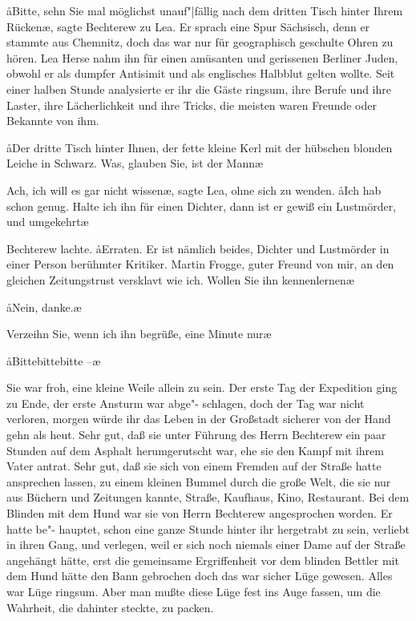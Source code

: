 \aa{}Bitte, sehn Sie mal möglichst unauf"|fällig nach dem dritten
Tisch hinter Ihrem Rücken\ae{}, sagte Bechterew zu Lea. Er
sprach eine Spur Sächsisch, denn er stammte aus Chemnitz,
doch das war nur für geographisch geschulte Ohren zu hören.
Lea Herse nahm ihn für einen amüsanten und gerissenen
Berliner Juden, obwohl er als dumpfer Antisimit und als
englisches Halbblut gelten wollte. Seit einer halben Stunde
analysierte er ihr die Gäste ringsum, ihre Berufe und ihre
Laster, ihre Lächerlichkeit und ihre Tricks, die meisten waren
Freunde oder Bekannte von ihm.

\aa{}Der dritte Tisch hinter Ihnen, der fette kleine Kerl mit der
hübschen blonden Leiche in Schwarz. Was, glauben Sie, ist
der Mann\frag{}\ae{}

\aanah{}Ach, ich will es gar nicht wissen\ae{}, sagte Lea, ohne sich zu
wenden. \aa{}Ich hab schon genug. Halte ich ihn für einen Dichter,
dann ist er gewiß ein Lustmörder, und umgekehrt\ausr{}\ae{}

Bechterew lachte. \aa{}Erraten. Er ist nämlich beides, Dichter
und Lustmörder in einer Person\dopp{} berühmter Kritiker. Martin
Frogge, guter Freund von mir, an den gleichen Zeitungstrust
versklavt wie ich. Wollen Sie ihn kennenlernen\frag{}\ae{}

\aa{}Nein, danke.\ae{}

\aanah{}Verzeihn Sie, wenn ich ihn begrüße, eine Minute nur\frag{}\ae{}

\aa{}Bittebittebitte --\ae{}

Sie war froh, eine kleine Weile allein zu sein. Der erste Tag
der Expedition ging zu Ende, der erste Ansturm war abge"-%
schlagen, doch der Tag war nicht verloren, morgen würde ihr
das Leben in der Großstadt sicherer von der Hand gehn als
heut. Sehr gut, daß sie unter Führung des Herrn Bechterew
ein paar Stunden auf dem Asphalt herumgerutscht war, ehe
sie den Kampf mit ihrem Vater antrat. Sehr gut, daß sie sich
von einem Fremden auf der Straße hatte ansprechen lassen,
zu einem kleinen Bummel durch die große Welt, die sie nur
aus Büchern und Zeitungen kannte, Straße, Kaufhaus,
Kino, Restaurant. Bei dem Blinden mit dem Hund war sie
von Herrn Bechterew angesprochen worden. Er hatte be"-%
hauptet, schon eine ganze Stunde hinter ihr hergetrabt zu
sein, verliebt in ihren Gang, und verlegen, weil er sich noch
niemals einer Dame auf der Straße angehängt hätte, erst die
gemeinsame Ergriffenheit vor dem blinden\eingriff{eS49-1}{blinden ] blindem} Bettler mit dem
Hund hätte den Bann gebrochen\dopp{} doch das war sicher Lüge
gewesen. Alles war Lüge ringsum. Aber man mußte diese
Lüge fest ins Auge fassen, um die Wahrheit, die dahinter steckte,
zu packen.

